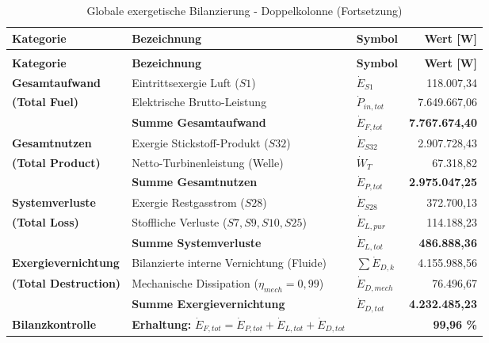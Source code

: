 \begin{longtable}{lllr}
\caption{Globale exergetische Bilanzierung - Doppelkolonnenmodell} \label{tab:globale_bilanz_doppel_final} \\
\hline
\textbf{Kategorie} & \textbf{Bezeichnung} & \textbf{Symbol} & \textbf{Wert [W]} \\
\hline
\endfirsthead
\caption[]{Globale exergetische Bilanzierung - Doppelkolonne (Fortsetzung)} \\
\hline
\textbf{Kategorie} & \textbf{Bezeichnung} & \textbf{Symbol} & \textbf{Wert [W]} \\
\hline
\endhead
\hline
\endfoot

\textbf{Gesamtaufwand} & Eintrittsexergie Luft ($S1$) & $\dot{E}_{S1}$ & 118.007,34 \\
\textbf{(Total Fuel)} & Elektrische Brutto-Leistung & $\dot{P}_{in,tot}$ & 7.649.667,06 \\
\cline{2-4}
& \textbf{Summe Gesamtaufwand} & $\dot{E}_{F,tot}$ & \textbf{7.767.674,40} \\
\hline

\textbf{Gesamtnutzen} & Exergie Stickstoff-Produkt ($S32$) & $\dot{E}_{S32}$ & 2.907.728,43 \\
\textbf{(Total Product)} & Netto-Turbinenleistung (Welle) & $\dot{W}_{T}$ & 67.318,82 \\
\cline{2-4}
& \textbf{Summe Gesamtnutzen} & $\dot{E}_{P,tot}$ & \textbf{2.975.047,25} \\
\hline

\textbf{Systemverluste} & Exergie Restgasstrom ($S28$) & $\dot{E}_{S28}$ & 372.700,13 \\
\textbf{(Total Loss)} & Stoffliche Verluste ($S7, S9, S10, S25$) & $\dot{E}_{L,pur}$ & 114.188,23 \\
\cline{2-4}
& \textbf{Summe Systemverluste} & $\dot{E}_{L,tot}$ & \textbf{486.888,36} \\
\hline

\textbf{Exergievernichtung} & Bilanzierte interne Vernichtung (Fluide) & $\sum \dot{E}_{D,k}$ & 4.155.988,56 \\
\textbf{(Total Destruction)} & Mechanische Dissipation ($\eta_{mech}=0,99$) & $\dot{E}_{D,mech}$ & 76.496,67 \\
\cline{2-4}
& \textbf{Summe Exergievernichtung} & $\dot{E}_{D,tot}$ & \textbf{4.232.485,23} \\
\hline

\textbf{Bilanzkontrolle} & \textbf{Erhaltung: } $\dot{E}_{F,tot} = \dot{E}_{P,tot} + \dot{E}_{L,tot} + \dot{E}_{D,tot}$ & & \textbf{99,96 \%} \\
\hline
\end{longtable}